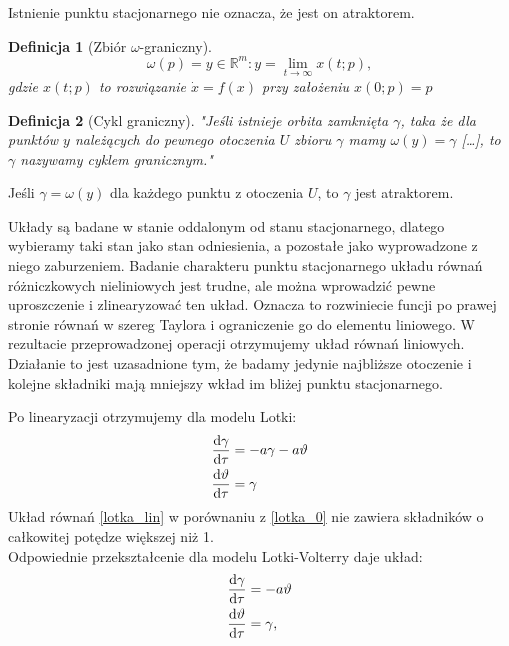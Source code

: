 \documentclass[10pt, a4paper, twoside, onecolumn]{article}
\numberwithin{equation}{section}
\newtheorem*{definition}{Definicja}
\begin{document}
	Istnienie punktu stacjonarnego nie oznacza, że jest on atraktorem. 
	\begin{definition}[Zbiór $\omega$-graniczny]
	\begin{equation*}
		\omega(p) = {y\in\mathbb{R}^{m}: y = \lim_{t\to\infty}}x(t; p),
	\end{equation*}
	gdzie \(x(t; p)\) to rozwiązanie \(\dot{x}=f(x)\) przy założeniu \(x(0; p) = p\)
	\end{definition}
	\begin{definition}[Cykl graniczny]
		"Jeśli istnieje orbita zamknięta $\gamma$, taka że dla punktów $y$ należących do pewnego otoczenia $U$ zbioru $\gamma$ mamy \(\omega(y)=\gamma\) [\ldots], to $\gamma$ nazywamy \emph{cyklem granicznym}."
	\end{definition}
	Jeśli \(\gamma=\omega(y)\) dla każdego punktu z otoczenia $U$, to $\gamma$ jest atraktorem. \cite{palczewski} \par
	Układy są badane w stanie oddalonym od stanu stacjonarnego, dlatego wybieramy taki stan jako stan odniesienia, a pozostałe jako wyprowadzone z niego zaburzeniem.
	Badanie charakteru punktu stacjonarnego układu równań różniczkowych nieliniowych jest trudne, ale można wprowadzić pewne uproszczenie i zlinearyzować ten układ. Oznacza to rozwiniecie funcji po prawej stronie równań w szereg Taylora i ograniczenie go do elementu liniowego. W rezultacie przeprowadzonej operacji otrzymujemy układ równań liniowych. Działanie to jest uzasadnione tym, że badamy jedynie najbliższe otoczenie i kolejne składniki mają mniejszy wkład im bliżej punktu stacjonarnego. \par
	Po linearyzacji otrzymujemy dla modelu Lotki:
	\begin{equation}\label{lotka_lin}
	\begin{split}
		\dv{\gamma}{\tau} &= -a\gamma-a\vartheta \\
		\dv{\vartheta}{\tau} &= \gamma
	\end{split}
	\end{equation}
	Układ równań \eqref{lotka_lin} w porównaniu z \eqref{lotka_0} nie zawiera składników o całkowitej potędze większej niż 1. \\
	Odpowiednie przekształcenie dla modelu Lotki-Volterry daje układ:
	\begin{equation}\label{lotka_volterra_lin}
	\begin{split}
		\dv{\gamma}{\tau} &= -a\vartheta \\
		\dv{\vartheta}{\tau} &= \gamma,
	\end{split}
	\end{equation}
\end{document}
